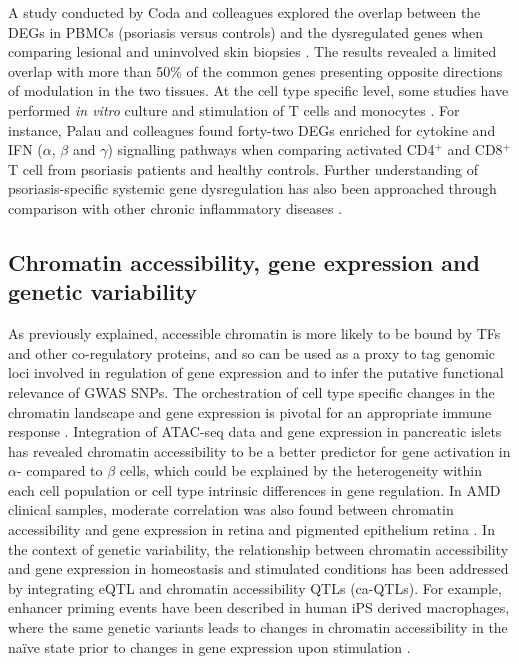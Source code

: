 A study conducted by Coda and colleagues explored the overlap between the DEGs in PBMCs (psoriasis versus controls) and the dysregulated genes when comparing lesional and uninvolved skin biopsies \parencite{Coda2012}. The results revealed a limited overlap with more than 50\% of the common genes presenting opposite directions of modulation in the two tissues. At the cell type specific level, some studies have performed \textit{in vitro} culture and stimulation of T cells and monocytes \parencite{Palau2013, Jung2004}. For instance, Palau and colleagues found forty-two DEGs enriched for cytokine and IFN ($\alpha$, $\beta$ and $\gamma$) signalling pathways when comparing activated CD4$^+$ and CD8$^+$ T cell from psoriasis patients and healthy controls. Further understanding of psoriasis-specific systemic gene dysregulation has also been approached through comparison with other chronic inflammatory diseases \parencite{Mesko2015}. %


\subsection{Chromatin accessibility, gene expression and genetic variability}
As previously explained, accessible chromatin is more likely to be bound by TFs and other co-regulatory proteins, and so can be used as a proxy to tag genomic loci involved in regulation of gene expression and to infer the putative functional relevance of GWAS SNPs. The orchestration of cell type specific changes in the chromatin landscape and gene expression is pivotal for an appropriate immune response \parencite{Goodnow2005}. Integration of ATAC-seq data and gene expression in pancreatic islets has revealed chromatin accessibility to be a better predictor for gene activation in $\alpha$- compared to $\beta$ cells, which could be explained by the heterogeneity within each cell population or cell type intrinsic differences in gene regulation. In AMD clinical samples, moderate correlation was also found between chromatin accessibility and gene expression in retina and pigmented epithelium retina \parencite{Wang2018}. In the context of genetic variability, the relationship between chromatin accessibility and gene expression in homeostasis and stimulated conditions has been addressed by integrating eQTL and chromatin accessibility QTLs (ca-QTLs). For example, enhancer priming events have been described in human iPS derived macrophages, where the same genetic variants leads to changes in chromatin accessibility in the na\"{i}ve state prior to changes in gene expression upon stimulation \parencite{Alasoo2018}. 


